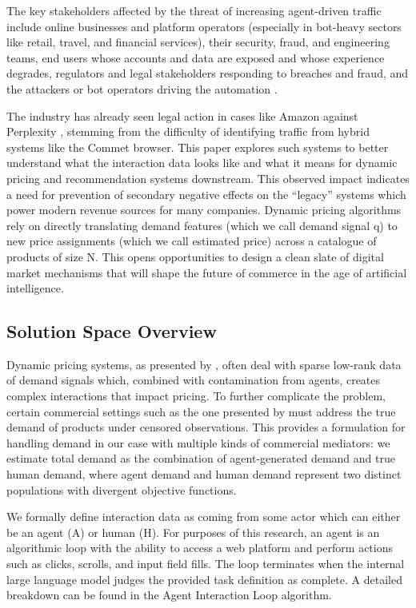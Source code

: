 The key stakeholders affected by the threat of increasing agent-driven traffic include online businesses and platform operators (especially in bot-heavy sectors like retail, travel, and financial services), their security, fraud, and engineering teams, end users whose accounts and data are exposed and whose experience degrades, regulators and legal stakeholders responding to breaches and fraud, and the attackers or bot operators driving the automation \parencite{imperva_rapid_2025}.

The industry has already seen legal action in cases like Amazon against Perplexity \parencite{ghaffary_amazon_2025}, stemming from the difficulty of identifying traffic from hybrid systems like the Commet browser. This paper explores such systems to better understand what the interaction data looks like and what it means for dynamic pricing and recommendation systems downstream. This observed impact indicates a need for prevention of secondary negative effects on the ``legacy'' systems which power modern revenue sources for many companies. Dynamic pricing algorithms rely on directly translating demand features (which we call demand signal q) to new price assignments (which we call estimated price) across a catalogue of products of size N. This opens opportunities to design a clean slate of digital market mechanisms that will shape the future of commerce in the age of artificial intelligence.

\subsection{Solution Space Overview}

Dynamic pricing systems, as presented by \textcite{mueller_low-rank_2019}, often deal with sparse low-rank data of demand signals which, combined with contamination from agents, creates complex interactions that impact pricing. To further complicate the problem, certain commercial settings such as the one presented by \textcite{amjad_censored_2017} must address the true demand of products under censored observations. This provides a formulation for handling demand in our case with multiple kinds of commercial mediators: we estimate total demand as the combination of agent-generated demand and true human demand, where agent demand and human demand represent two distinct populations with divergent objective functions.

We formally define interaction data as coming from some actor which can either be an agent (A) or human (H). For purposes of this research, an agent is an algorithmic loop with the ability to access a web platform and perform actions such as clicks, scrolls, and input field fills. The loop terminates when the internal large language model judges the provided task definition as complete. A detailed breakdown can be found in the Agent Interaction Loop algorithm.

